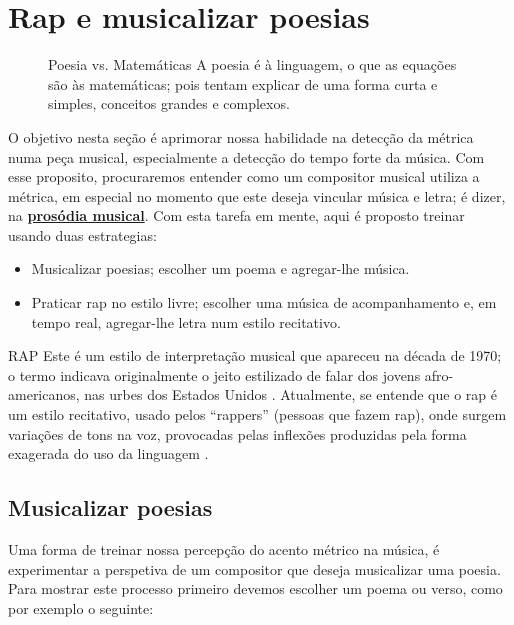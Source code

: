 \newpage
\section{Rap e musicalizar poesias}

\begin{figure}[b!]
\begin{FraseFernandoPR}{Poesia vs. Matemáticas}
A poesia é à linguagem, o que as equações são às matemáticas;
pois tentam explicar de uma forma curta e simples,
conceitos grandes e complexos. %
\end{FraseFernandoPR}
\end{figure}

O objetivo nesta seção é aprimorar nossa habilidade na detecção da métrica numa peça musical,
especialmente a detecção do tempo forte da música.
Com esse proposito, procuraremos entender como um compositor musical utiliza a métrica,
em especial no momento que este deseja vincular música e letra;
é dizer, na \hyperref[sec:ProsodiaMusical]{\textbf{prosódia musical}}. 
Com esta tarefa em mente, aqui é proposto treinar usando duas estrategias:
\begin{itemize}
\item Musicalizar poesias; escolher um poema e agregar-lhe música.
\item Praticar rap no estilo livre; escolher uma música de acompanhamento e, em tempo real, 
 agregar-lhe letra num estilo recitativo.
\end{itemize}


\begin{tcbinformation}{RAP}
\label{ref:RAP}
 Este é um estilo de interpretação musical que apareceu na década de 1970;
o termo indicava originalmente o jeito estilizado de falar dos jovens afro-americanos, 
nas urbes dos Estados Unidos  \cite[pp. 1250]{latham2008diccionario}.
Atualmente, se entende que o rap é um estilo recitativo,
usado pelos ``rappers'' (pessoas que fazem rap),
onde surgem variações de tons na voz, 
provocadas pelas inflexões produzidas pela forma exagerada do uso da linguagem \cite[pp. 1250]{latham2008diccionario}.
\end{tcbinformation} 


\subsection{Musicalizar poesias}
\label{subsec:musicalizarpoesias}
Uma forma de treinar nossa percepção do acento métrico na música, 
é experimentar a perspetiva de um compositor que deseja musicalizar uma poesia.
Para mostrar este processo primeiro devemos escolher um poema ou verso,
como por exemplo o seguinte:

